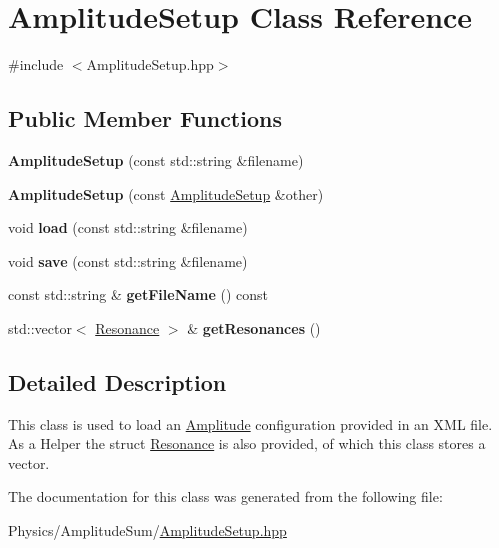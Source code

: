 \hypertarget{class_amplitude_setup}{\section{Amplitude\-Setup Class Reference}
\label{class_amplitude_setup}
}


{\ttfamily \#include $<$Amplitude\-Setup.\-hpp$>$}

\subsection*{Public Member Functions}
\begin{DoxyCompactItemize}
\item 
\hypertarget{class_amplitude_setup_a7b0216893bfed41c13d975aa683d6012}{{\bfseries Amplitude\-Setup} (const std\-::string \&filename)}\label{class_amplitude_setup_a7b0216893bfed41c13d975aa683d6012}

\item 
\hypertarget{class_amplitude_setup_a9e415d3cca43cd3e8f42fcd29e3fda3c}{{\bfseries Amplitude\-Setup} (const \hyperlink{class_amplitude_setup}{Amplitude\-Setup} \&other)}\label{class_amplitude_setup_a9e415d3cca43cd3e8f42fcd29e3fda3c}

\item 
\hypertarget{class_amplitude_setup_a93e574c5c827a2a74e90b12302e658a3}{void {\bfseries load} (const std\-::string \&filename)}\label{class_amplitude_setup_a93e574c5c827a2a74e90b12302e658a3}

\item 
\hypertarget{class_amplitude_setup_a337a729509cc9af427c4b7afa7bbb72d}{void {\bfseries save} (const std\-::string \&filename)}\label{class_amplitude_setup_a337a729509cc9af427c4b7afa7bbb72d}

\item 
\hypertarget{class_amplitude_setup_a28cb86bfdfd0ddadbbad64dfec88a16e}{const std\-::string \& {\bfseries get\-File\-Name} () const }\label{class_amplitude_setup_a28cb86bfdfd0ddadbbad64dfec88a16e}

\item 
\hypertarget{class_amplitude_setup_a75045bb7b79b7b315069e6f0267873a4}{std\-::vector$<$ \hyperlink{struct_resonance}{Resonance} $>$ \& {\bfseries get\-Resonances} ()}\label{class_amplitude_setup_a75045bb7b79b7b315069e6f0267873a4}

\end{DoxyCompactItemize}


\subsection{Detailed Description}
This class is used to load an \hyperlink{class_amplitude}{Amplitude} configuration provided in an X\-M\-L file. As a Helper the struct \hyperlink{struct_resonance}{Resonance} is also provided, of which this class stores a vector. 

The documentation for this class was generated from the following file\-:\begin{DoxyCompactItemize}
\item 
Physics/\-Amplitude\-Sum/\hyperlink{_amplitude_setup_8hpp}{Amplitude\-Setup.\-hpp}\end{DoxyCompactItemize}

